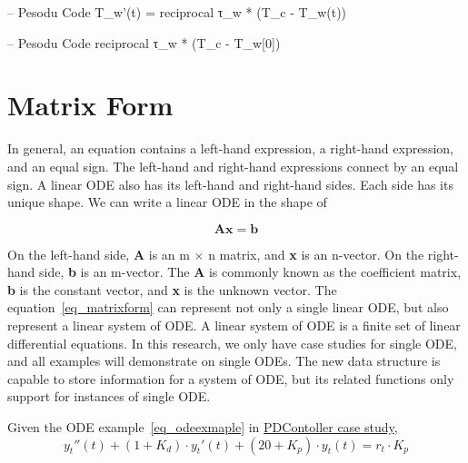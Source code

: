 \begin{listing}[ht]
\begin{haskell1}
-- Pesodu Code
T_w'(t) = reciprocal τ_w * (T_c - T_w(t))
\end{haskell1}
\label{code_expliciteqsrs}
\end{listing}

\begin{listing}[ht]
\begin{haskell1}
-- Pesodu Code
reciprocal τ_w * (T_c - T_w[0])
\end{haskell1}
\label{code_expliciteq}
\end{listing}

\section{Matrix Form}
In general, an equation contains a left-hand expression, a right-hand expression, and an equal sign. The left-hand and right-hand expressions connect by an equal sign. A linear ODE also has its left-hand and right-hand sides. Each side has its unique shape. We can write a linear ODE in the shape of

\begin{equation} \label{eq_matrixform}
	\boldsymbol{Ax} = \boldsymbol{b}
\end{equation}

On the left-hand side, \textbf{A} is an m $\times$ n matrix, and \textbf{x} is an n-vector. On the right-hand side, \textbf{b} is an m-vector. The \textbf{A} is commonly known as the coefficient matrix, \textbf{b} is the constant vector, and \textbf{x} is the unknown vector. The equation~\ref{eq_matrixform} can represent not only a single linear ODE, but also represent a linear system of ODE. A linear system of ODE is a finite set of linear differential equations. In this research, we only have case studies for single ODE, and all examples will demonstrate on single ODEs. The new data structure is capable to store information for a system of ODE, but its related functions only support for instances of single ODE.

Given the ODE example~\ref{eq_odeexmaple} in \href{https://jacquescarette.github.io/Drasil/examples/pdcontroller/SRS/srs/PDController_SRS.html#Sec:IMs}{PDContoller case study},
\begin{equation} \label{eq_odeexmaple}
	y_t''(t) + (1 + K_d) \cdot y_t'(t) + (20 + K_p) \cdot y_t(t) = r_t \cdot K_p
\end{equation}

